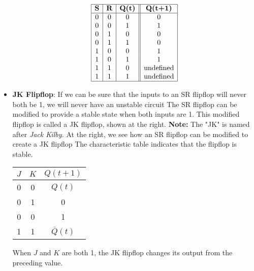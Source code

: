 \documentclass{report}
\begin{document}
\begin{itemize}
            \[
                \begin{array}{|c|c|c||c|}
                    \hline
                    \textbf{S} & \textbf{R} & \textbf{Q(t)} & \textbf{Q(t+1)} \\
                    \hline
                    0 & 0 & 0 & 0 \\
                    0 & 0 & 1 & 1 \\
                    0 & 1 & 0 & 0 \\
                    0 & 1 & 1 & 0 \\
                    1 & 0 & 0 & 1 \\
                    1 & 0 & 1 & 1 \\
                    1 & 1 & 0 & \text{undefined} \\
                    1 & 1 & 1 & \text{undefined} \\
                    \hline
                \end{array}
            \]
        \item \textbf{JK Flipflop}: If we can be sure that the inputs to an SR flipflop will never both be 1, we will never have an unstable circuit
            \bigbreak \noindent 
            The SR flipflop can be modified to provide a stable state when both inputs are 1.
            \bigbreak \noindent 
             This modified flipflop is called a JK flipflop, shown at the right.
             \bigbreak \noindent 
             \textbf{Note:} The "JK" is named after \textit{Jack Kilby.}
             \bigbreak \noindent 
             \bigbreak \noindent 
             At the right, we see how an SR flipflop can be modified to create a JK flipflop
             \bigbreak \noindent 
             \bigbreak \noindent 
             The characteristic table indicates that the flipflop is stable.
             \bigbreak \noindent 
             \begin{center}
                 \begin{tabular}{cc|c}
                     $J$ & $K$ & $Q(t+1)$  \\
                     \hline
                     0 & 0 & $Q(t)$ \\
                     0 & 1 & 0 \\
                     0 & 0  & 1\\
                     1 & 1 & $\bar{Q}(t)$
                 \end{tabular}
             \end{center}
             \bigbreak \noindent 
             When $J$ and $K$ are both 1, the JK flipflop changes its output from the preceding value.


\end{itemize}
\end{document}
